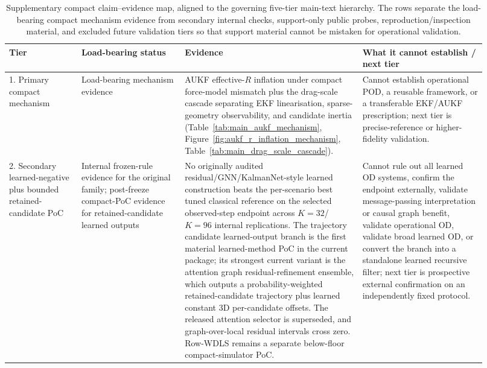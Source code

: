\documentclass{article}
\begin{document}
\begin{table}[t]
  \centering\scriptsize
  \caption{Supplementary compact claim--evidence map, aligned to the governing five-tier main-text hierarchy. The rows separate the load-bearing compact mechanism evidence from secondary internal checks, support-only public probes, reproduction/inspection material, and excluded future validation tiers so that support material cannot be mistaken for operational validation.}
  \label{tab:load_bearing_claim_map}
  \begingroup\setlength{\tabcolsep}{3pt}
  \begin{tabular}{@{}p{0.14\linewidth}p{0.20\linewidth}p{0.34\linewidth}p{0.24\linewidth}@{}}
    \toprule
    Tier & Load-bearing status & Evidence & What it cannot establish / next tier \\
    \midrule
    1. Primary compact mechanism & Load-bearing mechanism evidence & AUKF effective-$R$ inflation under compact force-model mismatch plus the drag-scale cascade separating EKF linearisation, sparse-geometry observability, and candidate inertia (Table~\ref{tab:main_aukf_mechanism}, Figure~\ref{fig:aukf_r_inflation_mechanism}, Table~\ref{tab:main_drag_scale_cascade}). & Cannot establish operational POD, a reusable framework, or a transferable EKF/AUKF prescription; next tier is precise-reference or higher-fidelity validation. \\
    2. Secondary learned-negative plus bounded retained-candidate PoC & Internal frozen-rule evidence for the original family; post-freeze compact-PoC evidence for retained-candidate learned outputs & No originally audited residual/GNN/KalmanNet-style learned construction beats the per-scenario best tuned classical reference on the selected observed-step endpoint across $K=32$/$K=96$ internal replications. The trajectory candidate learned-output branch is the first material learned-method PoC in the current package; its strongest current variant is the attention graph residual-refinement ensemble, which outputs a probability-weighted retained-candidate trajectory plus learned constant 3D per-candidate offsets. The released attention selector is superseded, and graph-over-local residual intervals cross zero. Row-WDLS remains a separate below-floor compact-simulator PoC. & Cannot rule out all learned OD systems, confirm the endpoint externally, validate message-passing interpretation or causal graph benefit, validate operational OD, validate broad learned OD, or convert the branch into a standalone learned recursive filter; next tier is prospective external confirmation on an independently fixed protocol. \\

\end{tabular}
\end{table}
\end{document}
